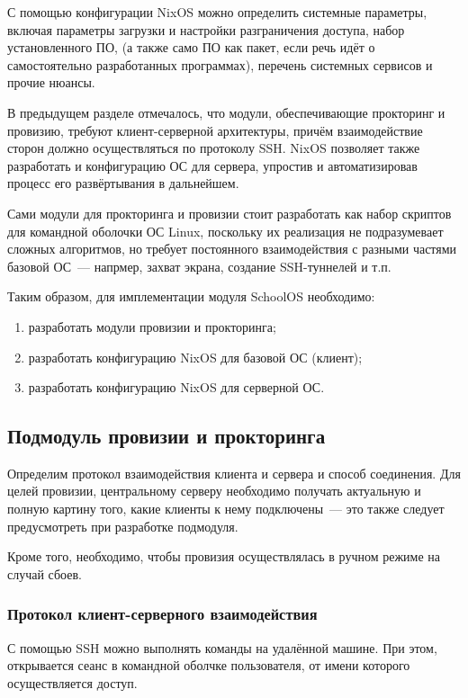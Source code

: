 С помощью конфигурации NixOS можно определить системные параметры, включая параметры загрузки и настройки разграничения доступа, набор установленного ПО, (а также само ПО как пакет, если речь идёт о самостоятельно разработанных программах), перечень системных сервисов и прочие нюансы.

В предыдущем разделе отмечалось, что модули, обеспечивающие прокторинг и провизию, требуют клиент-серверной архитектуры, причём взаимодействие сторон должно осуществляться по протоколу SSH. NixOS позволяет также разработать и конфигурацию ОС для сервера, упростив и автоматизировав процесс его развёртывания в дальнейшем.

Сами модули для прокторинга и провизии стоит разработать как набор скриптов для командной оболочки ОС Linux, поскольку их реализация не подразумевает сложных алгоритмов, но требует постоянного взаимодействия с разными частями базовой ОС~--- напрмер, захват экрана, создание SSH-туннелей и т.п.

Таким образом, для имплементации модуля SchoolOS необходимо:
\begin{enumerate}
\item
  разработать модули провизии и прокторинга;
\item
  разработать конфигурацию NixOS для базовой ОС (клиент);
\item
  разработать конфигурацию NixOS для серверной ОС.
\end{enumerate}

\subsection{Подмодуль провизии и прокторинга}

Определим протокол взаимодействия клиента и сервера и способ соединения. Для целей провизии, центральному серверу необходимо получать актуальную и полную картину того, какие клиенты к нему подключены~--- это также следует предусмотреть при разработке подмодуля.

Кроме того, необходимо, чтобы провизия осуществлялась в ручном режиме на случай сбоев.

\subsubsection{Протокол клиент-серверного взаимодействия}

С помощью SSH можно выполнять команды на удалённой машине. При этом, открывается сеанс в командной оболчке пользователя, от имени которого осуществляется доступ.

